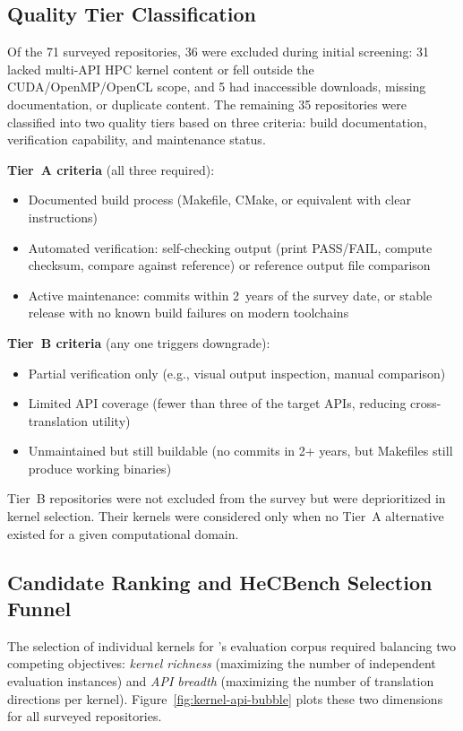 \subsection{Quality Tier Classification}
\label{sec:appendix-c2}

Of the 71 surveyed repositories, 36 were excluded during initial screening: 31 lacked multi-API HPC kernel content or fell outside the CUDA/OpenMP/OpenCL scope, and 5 had inaccessible downloads, missing documentation, or duplicate content. The remaining 35 repositories were classified into two quality tiers based on three criteria: build documentation, verification capability, and maintenance status.

\textbf{Tier~A criteria} (all three required):
\begin{itemize}
    \item Documented build process (Makefile, CMake, or equivalent with clear instructions)
    \item Automated verification: self-checking output (print PASS/FAIL, compute checksum, compare against reference) or reference output file comparison
    \item Active maintenance: commits within 2~years of the survey date, or stable release with no known build failures on modern toolchains
\end{itemize}

\textbf{Tier~B criteria} (any one triggers downgrade):
\begin{itemize}
    \item Partial verification only (e.g., visual output inspection, manual comparison)
    \item Limited API coverage (fewer than three of the target APIs, reducing cross-translation utility)
    \item Unmaintained but still buildable (no commits in 2+ years, but Makefiles still produce working binaries)
\end{itemize}

Tier~B repositories were not excluded from the survey but were deprioritized in kernel selection. Their kernels were considered only when no Tier~A alternative existed for a given computational domain.

\subsection{Candidate Ranking and HeCBench Selection Funnel}
\label{sec:appendix-c3}

The selection of individual kernels for \parbench{}'s evaluation corpus required balancing two competing objectives: \emph{kernel richness} (maximizing the number of independent evaluation instances) and \emph{API breadth} (maximizing the number of translation directions per kernel). Figure~\ref{fig:kernel-api-bubble} plots these two dimensions for all surveyed repositories.

